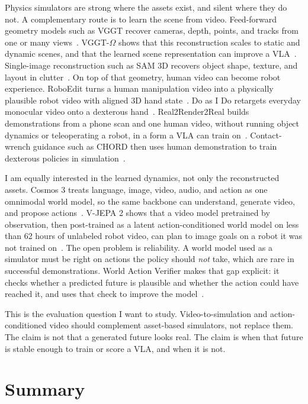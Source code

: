 \documentclass[11pt]{article}
\begin{document}
Physics simulators are strong where the assets exist, and silent where they do not. A complementary route is to learn the scene from video. Feed-forward geometry models such as VGGT recover cameras, depth, points, and tracks from one or many views~\cite{wang2025vggt}. VGGT-$\Omega$ shows that this reconstruction scales to static and dynamic scenes, and that the learned scene representation can improve a VLA~\cite{wang2026vggtomega}. Single-image reconstruction such as SAM 3D recovers object shape, texture, and layout in clutter~\cite{sam3d2025}. On top of that geometry, human video can become robot experience. RoboEdit turns a human manipulation video into a physically plausible robot video with aligned 3D hand state~\cite{guo2026roboedit}. Do as I Do retargets everyday monocular video onto a dexterous hand~\cite{paliwal2026doasido}. Real2Render2Real builds demonstrations from a phone scan and one human video, without running object dynamics or teleoperating a robot, in a form a VLA can train on~\cite{yu2025r2r2r}. Contact-wrench guidance such as CHORD then uses human demonstration to train dexterous policies in simulation~\cite{zhu2026chord}.

I am equally interested in the learned dynamics, not only the reconstructed assets. Cosmos 3 treats language, image, video, audio, and action as one omnimodal world model, so the same backbone can understand, generate video, and propose actions~\cite{nvidia2026cosmos3}. V-JEPA 2 shows that a video model pretrained by observation, then post-trained as a latent action-conditioned world model on less than 62 hours of unlabeled robot video, can plan to image goals on a robot it was not trained on~\cite{assran2025vjepa2}. The open problem is reliability. A world model used as a simulator must be right on actions the policy should \textit{not} take, which are rare in successful demonstrations. World Action Verifier makes that gap explicit: it checks whether a predicted future is plausible and whether the action could have reached it, and uses that check to improve the model~\cite{liu2026wav}.

This is the evaluation question I want to study. Video-to-simulation and action-conditioned video should complement asset-based simulators, not replace them. The claim is not that a generated future looks real. The claim is when that future is stable enough to train or score a VLA, and when it is not.

\section*{Summary}
\end{document}
